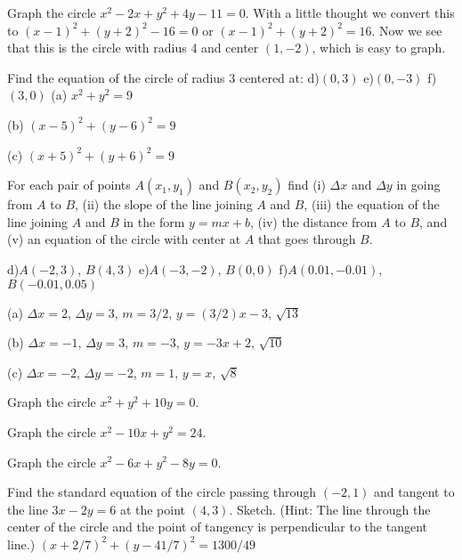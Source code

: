 \example Graph the circle $x^2-2x+y^2+4y-11=0$. With a little thought
we convert this to $(x-1)^2+(y+2)^2-16=0$ or $(x-1)^2+(y+2)^2=16$.
Now we see that this is the circle with radius 4 and center $(1,-2)$,
which is easy to graph.
\endexample

\exercises

\exercise
Find the equation of the circle of radius 3 centered at: 
\beginlist
{} {d)}{$(0,3)$}
 {e)}{$(0,-3)$}
 {f)}{$(3,0)$}
\endlist
\answer (a) $x^2+y^2=9$
\item{} (b) $(x-5)^2+(y-6)^2=9$
\item{} (c) $(x+5)^2+(y+6)^2=9$
\endanswer
\endexercise

\exercise
For each pair of points $A(x_1,y_1)$ and $B(x_2,y_2)$ find (i) $\Delta x$
and $\Delta y$ in going from $A$ to $B$, (ii) the slope of the line joining
$A$ and $B$, (iii) the equation of the line joining $A$ and $B$ in the form
$y=mx+b$, (iv) the distance from $A$ to $B$, and (v) an equation of
the circle with center at $A$ that goes through $B$.

\beginlist

 {d)}{$A(-2,3)$, $B(4,3)$}
 {e)}{$A(-3,-2)$, $B(0,0)$} 
 {f)}{$A(0.01,-0.01)$, $B(-0.01,0.05)$}

\endlist
\answer (a) $\Delta x=2$, $\Delta y = 3$, $m=3/2$, $y=(3/2)x-3$, $\sqrt{13}$

\item{}(b) $\Delta x=-1$, $\Delta y = 3$, $m=-3$, $y=-3x+2$, $\sqrt{10}$

\item{}(c) $\Delta x=-2$, $\Delta y = -2$, $m=1$, $y=x$, $\sqrt{8}$
\endanswer
\endexercise

\exercise
Graph the circle $x^2+y^2+10y=0$.
\endexercise

\exercise
Graph the circle $x^2-10x+y^2=24$.
\endexercise

\exercise
Graph the circle $x^2-6x+y^2-8y=0$.
\endexercise

\exercise Find the standard equation of the circle passing through $(-2,1)$
 and tangent to the line $3x-2y =6$ at the point $(4,3)$.  Sketch. 
 (Hint: The line through the center of the circle and the point of tangency
 is perpendicular to the tangent line.)
\answer $(x+2/7)^2+(y-41/7)^2=1300/49$
\endanswer
\endexercise

\endexercises
